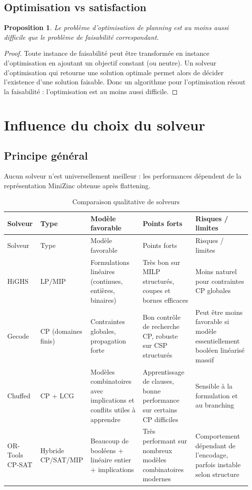 \documentclass[12pt,a4paper]{article}
\newtheorem{proposition}{Proposition}[section]
\begin{document}
\subsection{Optimisation vs satisfaction}
\begin{proposition}
Le problème d'optimisation de planning est au moins aussi difficile que le problème de faisabilité correspondant.
\end{proposition}
\begin{proof}
Toute instance de faisabilité peut être transformée en instance d'optimisation en ajoutant un objectif constant (ou neutre). Un solveur d'optimisation qui retourne une solution optimale permet alors de décider l'existence d'une solution faisable. Donc un algorithme pour l'optimisation résout la faisabilité : l'optimisation est au moins aussi difficile.
\end{proof}

\section{Influence du choix du solveur}

\subsection{Principe général}
Aucun solveur n'est universellement meilleur : les performances dépendent de la représentation MiniZinc obtenue après flattening.

\begin{longtable}{@{}p{2.2cm}p{2.2cm}p{3.5cm}p{3.4cm}p{3.1cm}@{}}
\caption{Comparaison qualitative de solveurs}\label{tab:solveurs}\\
\toprule
Solveur & Type & Modèle favorable & Points forts & Risques / limites \\
\midrule
\endfirsthead
\toprule
Solveur & Type & Modèle favorable & Points forts & Risques / limites \\
\midrule
\endhead
HiGHS & LP/MIP & Formulations linéaires (continues, entières, binaires) & Très bon sur MILP structurés, coupes et bornes efficaces & Moins naturel pour contraintes CP globales \\
Gecode & CP (domaines finis) & Contraintes globales, propagation forte & Bon contrôle de recherche CP, robuste sur CSP structurés & Peut être moins favorable si modèle essentiellement booléen linéarisé massif \\
Chuffed & CP + LCG & Modèles combinatoires avec implications et conflits utiles à apprendre & Apprentissage de clauses, bonne performance sur certains CP difficiles & Sensible à la formulation et au branching \\
OR-Tools CP-SAT & Hybride CP/SAT/MIP & Beaucoup de booléens + linéaire entier + implications & Très performant sur nombreux modèles combinatoires modernes & Comportement dépendant de l'encodage, parfois instable selon structure \\
\bottomrule
\end{longtable}
\end{document}

